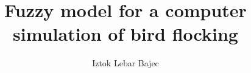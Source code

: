 \documentclass[english,PhD,press]{FRIthesis}
\title[Fuzzy animats]%
      [Mehki animati]%
      {Fuzzy model for a computer simulation of bird flocking}%
      {Mehki model za računalniško simulacijo letenja ptic v jati}
\author[I. Lebar Bajec]{Iztok Lebar Bajec}{24940006}
\begin{document}
\makecoverpage
\end{document}
